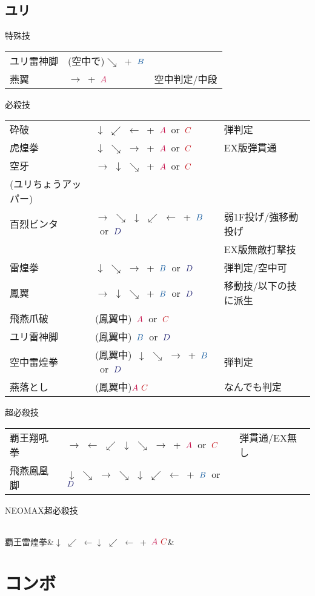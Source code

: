 \documentclass[a4j,11pt]{jarticle}
\def\A{\textcolor{Acolor}{A}}
\def\C{\textcolor{Ccolor}{C}}
\def\B{\textcolor{Bcolor}{B}}
\def\D{\textcolor{Dcolor}{D}}
\def\hado{$\downarrow$ $\searrow$ $\rightarrow$}%
\def\tatsu{$\downarrow$ $\swarrow$ $\leftarrow$}%
\def\syoryu{$\rightarrow$ $\downarrow$ $\searrow$}%
\def\yoga{$\leftarrow$ $\swarrow$ $\downarrow$ $\searrow$ $\rightarrow$}%
\def\gyakuyoga{$\rightarrow$ $\searrow$ $\downarrow$ $\swarrow$ $\leftarrow$}%
\def\ryuko{$\downarrow$ $\searrow$ $\rightarrow$ $\searrow$ $\downarrow$ $\swarrow$ $\leftarrow$}%
\begin{document}
\subsection{ユリ}
\begin{itembox}[l]{特殊技}
\begin{tabular}{lll}
ユリ雷神脚&(空中で)$\searrow$\ +\ $\B$&\\%
燕翼&$\rightarrow$\ +\ $\A$&空中判定/中段
\end{tabular}
\end{itembox}
\begin{itembox}[l]{必殺技}
\begin{tabular}{lll}
砕破&\tatsu\ +\ $\A$\ or\ $\C$&弾判定\\%
虎煌拳&\hado\ +\ $\A$\ or\ $\C$&EX版弾貫通\\%
空牙&\syoryu\ +\ $\A$\ or\ $\C$&\\%
(ユリちょうアッパー)&&\\
百烈ビンタ&\gyakuyoga\ +\ $\B$\ or\ $\D$&弱1F投げ/強移動投げ\\
&&EX版無敵打撃技\\%
雷煌拳&\hado\ +\ $\B$\ or\ $\D$&弾判定/空中可\\%
鳳翼&\syoryu\ +\ $\B$\ or\ $\D$&移動技/以下の技に派生\\%
飛燕爪破&(鳳翼中)\ $\A$\ or\ $\C$&\\%
ユリ雷神脚&(鳳翼中)\ $\B$\ or\ $\D$&\\%
空中雷煌拳&(鳳翼中)\ \hado\ +\ $\B$\ or\ $\D$&弾判定\\%
燕落とし&(鳳翼中)$\A\ \C$&なんでも判定%
\end{tabular}
\end{itembox}
\begin{itembox}[l]{超必殺技}
\begin{tabular}{lll}
覇王翔吼拳&$\rightarrow$ \yoga\ +\ $\A$\ or\ $\C$&弾貫通/EX無し\\%
飛燕鳳凰脚&\ryuko\ +\ $\B$\ or\ $\D$&%
\end{tabular}
\end{itembox}
\begin{itembox}[l]{NEOMAX超必殺技}
\begin{tabular}{lll}
\end{tabular}
覇王雷煌拳&\tatsu\tatsu\ +\ $\A\ \C$&%
\end{itembox}
\newpage
\section{コンボ}
\end{document}
